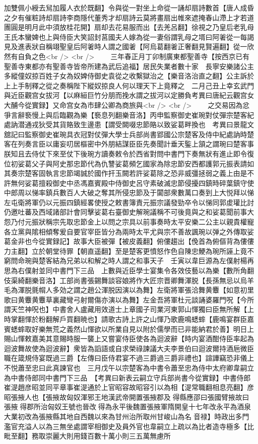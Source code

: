 加雙佩小綬去舃加履人衣於既翻】令與從一對坐上命從一誦却扇詩數首【唐人成昏之夕有催粧詩却扇詩李商隱代董秀才却扇詩云莫將畫扇出帷來遮掩春山滯上才若道團圓是明月此中須放桂花開】扇却去花易服而出【去羌呂翻】徐視之乃皇后老乳母王氏本蠻婢也上與侍臣大笑詔封莒國夫人嫁為從一妻俗謂乳母之壻曰阿㸙從一每謁見及進表狀自稱翊聖皇后阿㸙時人謂之國㸙【阿烏葛翻㸙正奢翻見賢遍翻】從一欣然有自負之色<br />
<br />
　　三年春正月丁卯制廣東都聖善寺【按西京已有聖善寺東都亦有聖善寺皆帝所建為武后追福】居民失業者數十家　長寧安樂諸公主多縱僮奴掠百姓子女為奴婢侍御史袁從之收繫獄治之【樂音洛治直之翻】公主訴於上上手制釋之從之奏稱陛下縱奴掠良人何以理天下上竟釋之　二月己丑上幸玄武門與近臣觀宫女拔河【以麻絙巨竹分朋而挽水謂之拔河以定勝負考異曰唐紀云觀宫女大酺今從實録】又命宫女為市肆公卿為商旅與<br />
<br />
　　之交易因為忿爭言辭䙝慢上與后臨觀為樂【䙝息列翻樂音洛】丙申監察御史崔琬對仗彈宗楚客紀處訥潜通戎狄受其貨賂致生邊患【謂受闕啜忠節賂以致娑葛畔換也　考異曰景龍文舘記曰監察御史崔琬具衣冠對仗彈大學士兵部尚書郢國公宗楚客及侍中紀處訥時楚客在列奏言臣以庸妄叨居樞密中外朋結謀臣臣先奏聞計垂天鍳上頷之謂琬曰楚客事朕知且去侍仗下來至仗下後琬方讀奏敕令於西省對問中書門下奏無狀有進止即令復位初娑葛父子與阿史那忠節代為仇讐娑葛頻乞國家為除忠節安西都護郭元振表請如其奏宗楚客固執言忠節竭誠於國作扞玉闕若許娑葛除之恐非威彊拯弱之義上由是不許無何娑葛擅殺御史中丞馮嘉賓殿中侍御史呂守素破滅忠節侵擾四鎮時碎葉鎮守使中郎周以悌率鎮兵數百人大破之奪其所侵忠節及于闐部衆數萬口奏到上大悦拜以悌左屯衛將軍仍以元振四鎮經畧使授之敕書簿責元振宗議發勁卒令以悌同郭䖍瓘比討仍邀吐蕃及西域諸部計會同擊娑葛右臺御史解琬議稱不可後竟與之和娑葛聞前事大怨乃付元振狀稱宗先取忠節金上以問之宗具以前事奏時太平安樂二公主以親貴權寵各立黨與隂相傾奪爰自要官宰臣皆分為兩時太平尤與宗不善故諷琬以弹之外傳取娑葛金非也今從實録記】故事大臣被彈【被皮義翻】俯僂趨出【俛首為俯傴背為僂僂力主翻】立於朝堂待罪【朝直遥翻】至是楚客更憤怒作色自陳忠鯁為琬所誣上竟不窮問命琬與楚客結為兄弟以和解之時人謂之和事天子　壬寅以韋巨源為左僕射楊再思為右僕射並同中書門下三品　上數與近臣學士宴集令各效伎藝以為樂【數所角翻伎渠綺翻樂音洛】工部尚書張錫舞談容娘將作大匠宗晋卿舞渾脱【長孫無忌以烏羊毛為渾脱氈㡌人多効之謂之趙公渾脱因演以為舞】左衛將軍張洽舞黄麞【如意初里歌曰黄麞黄麞草裏藏彎弓射爾傷亦演以為舞】左金吾將軍杜元談誦婆羅門呪【今所謂天竺神呪也】中書舍人盧藏用效道士上章國子司業河東郭山惲獨曰臣無所解【上時掌翻惲於粉翻解戶買翻暁也】請歌古詩上許之山惲乃歌鹿鳴蟋蟀【鹿鳴宴群臣嘉賓蟋蟀取好樂無荒之義然山惲欲以所業自見以附於儒學而已非能納君於善】明日上賜山惲敕嘉美其意賜時服一襲上又嘗宴侍臣使各為迴波辭【時内宴酒酣侍臣率起為迴波舞故使為迴波辭】衆皆為謟語或自求榮祿諫議大夫李景伯曰迴波爾持酒巵微臣職在箴規侍宴既過三爵【左傳曰臣侍君宴不過三爵過三爵非禮也】諠譁竊恐非儀上不悦蕭至忠曰此真諫官也　三月戊午以宗楚客為中書令蕭至忠為侍中太府卿韋嗣立為中書侍郎同中書門下三品　【考異曰新表云嗣立守兵部尚書今從實録】中書侍郎崔湜趙彦昭並同平章事崔湜通於上官昭容故昭容引以為相【湜常職翻相息亮翻】彦昭張掖人也【張掖故匈奴渾邪王地漢武帝開置張掖郡及得縣應邵曰張國臂掖故曰張掖得郡所治匈奴王號也晉改得為永平後魏置張掖軍隋開皇十七年改永平為酒泉大業初改為張掖縣其地自西魏以來為甘州治所取州甘峻山為名音禄】時政出多門濫官充溢人以為三無坐處謂宰相御史及員外官也韋嗣立上疏以為比者造寺極多【比毗至翻】務取崇麗大則用錢百數十萬小則三五萬無慮所